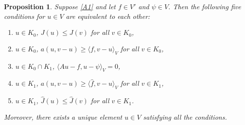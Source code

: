 \documentclass[reqno,10pt]{amsart}
\newtheorem{Prop}[Th]{Proposition}
\begin{document}
\begin{Prop}\label{th1}
Suppose \eqref{A1} and let $f\in V'$ and $\psi\in V$.
Then the following five conditions for $u \in V$ are equivalent
to each other\/{\rm :}
\begin{enumerate}[{\rm (a)}]
\item
$u\in K_0$, $J(u)\le J(v)$ for all $v\in K_0$,
\item
$u\in K_0$, $a(u,v-u)\ge \langle f,v-u\rangle_V$ for all $v\in K_0$,
\item
$u\in K_0\cap K_1$, $\langle Au-f,u-\psi\rangle_V =0$,
\item
$u\in K_1$, $a(u,v-u)\ge \langle \hat{f},v-u\rangle_V$ for all $v\in K_1$,
\item
$u\in K_1$, $\hat{J}(u)\le \hat{J}(v)$ for all $v\in K_1$.
\end{enumerate}
Moreover, there exists a unique element $u \in V$ satisfying all the
 conditions. 
\end{Prop}
\end{document}
